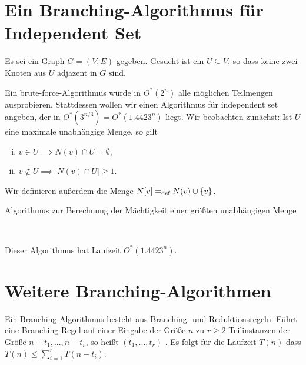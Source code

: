 \section{Ein Branching-Algorithmus für Independent Set}

  Es sei ein Graph \(G = (V,E)\) gegeben. Gesucht ist ein \(U \subseteq V\), so dass keine zwei Knoten aus \(U\) adjazent in \(G\) sind.

  Ein brute-force-Algorithmus würde in \(O^*(2^n)\) alle möglichen Teilmengen ausprobieren. Stattdessen wollen wir einen Algorithmus für independent set angeben, der in \(O^*(3^{n/3}) = O^*(1.4423^n)\) liegt. Wir beobachten zunächst: Ist \(U\) eine maximale unabhängige Menge, so gilt

  \begin{enumerate}[(i)]
   \item \(v \in U \implies N(v) \cap U = \emptyset\),
   \item \(v \notin U \implies |N(v) \cap U| \geq 1\).
  \end{enumerate}

  Wir definieren außerdem die Menge \(N[v] =_\text{def} N(v) \cup \{v\}\).

  \begin{algorithm}[H]
    \caption{Algorithmus zur Berechnung der Mächtigkeit einer größten unabhängigen Menge}

     \\

  \end{algorithm}

  Dieser Algorithmus hat Laufzeit \(O^*(1.4423^n)\).

\section{Weitere Branching-Algorithmen}

  Ein Branching-Algorithmus besteht aus Branching- und Reduktionsregeln. Führt eine Branching-Regel auf einer Eingabe der Größe \(n\) zu \(r \geq 2\) Teilinstanzen der Größe \(n - t_1, ..., n - t_r\), so heißt \( (t_1,...,t_r) \) . Es folgt für die Laufzeit \(T(n)\) dass \(T(n) \leq \sum_{i=1}^r T(n-t_i)\).

